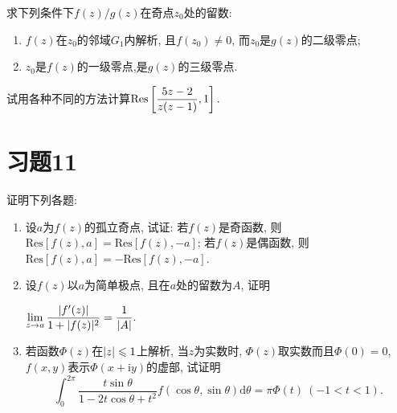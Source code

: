 \begin{yyEx}
	求下列条件下$f(z)/g(z)$在奇点$z_0$处的留数:
	\begin{enumerate}
		\item $f(z)$在$z_0$的邻域$G_1$内解析, 且$f(z_0)\neq 0$, 而$z_0$是$g(z)$的二级零点;
		\item $z_0$是$f(z)$的一级零点,是$g(z)$的三级零点.
	\end{enumerate}
\end{yyEx}

\begin{yyEx}
	试用各种不同的方法计算$\begin{lgathered}
		\mathrm{Res}\left[ \frac{5z-2}{z(z-1)},1 \right].
	\end{lgathered}$
\end{yyEx}

\section{习题11}

\begin{yyEx}
	证明下列各题:
	\begin{enumerate}
		\item 设$a$为$f(z)$的孤立奇点, 试证: 若$f(z)$是奇函数, 则$\mathrm{Res}[f(z),a] = \mathrm{Res}[f(z), -a]$; 若$f(z)$是偶函数, 则$\mathrm{Res}[f(z),a] = -\mathrm{Res}[f(z), -a]$.
		\item 设$f(z)$以$a$为简单极点, 且在$a$处的留数为$A$, 证明
		
		$\begin{lgathered}
			\lim\limits_{z\to a}\frac{\abs{f'(z)}}{1+\abs{f(z)}^2} = \frac{1}{\abs{A}}.
		\end{lgathered}$
		\item 若函数$\varPhi(z)$在$\lvert z\rvert\leqslant 1$上解析, 当$z$为实数时, $\varPhi(z)$取实数而且$\varPhi(0) = 0$, $f(x,y)$表示$\varPhi(x+\mathrm{i}y)$的虚部, 试证明
		\begin{equation*}
			\int_{0}^{2\pi}\frac{t\sin\theta}{1-2t\cos\theta+t^2}f(\cos\theta,\sin\theta)\mathrm{d}\theta = \pi\varPhi(t)~(-1<t<1).
		\end{equation*}
	\end{enumerate}
\end{yyEx}